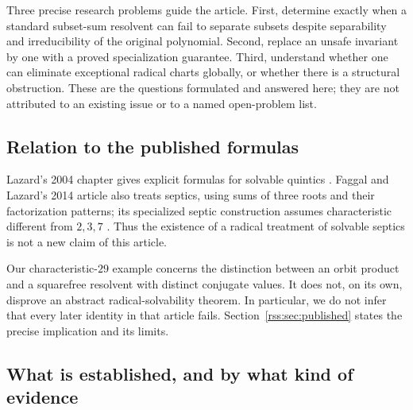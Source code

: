 \documentclass[11pt,a4paper]{article}
\theoremstyle{definition}
\theoremstyle{remark}
\begin{document}
Three precise research problems guide the article. First, determine exactly
when a standard subset-sum resolvent can fail to separate subsets despite
separability and irreducibility of the original polynomial. Second, replace
an unsafe invariant by one with a proved specialization guarantee. Third,
understand whether one can eliminate exceptional radical charts globally,
or whether there is a structural obstruction. These are the questions
formulated and answered here; they are not attributed to an existing issue
or to a named open-problem list.

\subsection{Relation to the published formulas}

Lazard's 2004 chapter gives explicit formulas for solvable quintics
\cite{Lazard2004}. Faggal and Lazard's 2014 article also treats septics, using
sums of three roots and their factorization patterns; its specialized septic
construction assumes characteristic different from $2,3,7$
\cite{FaggalLazard2014}. Thus the existence of a radical treatment of solvable
septics is not a new claim of this article.

Our characteristic-$29$ example concerns the distinction between an orbit
product and a squarefree resolvent with distinct conjugate values. It does
not, on its own, disprove an abstract radical-solvability theorem. In
particular, we do not infer that every later identity in that article fails.
Section~\ref{rss:sec:published} states the precise implication and its limits.

\subsection{What is established, and by what kind of evidence}
\end{document}
